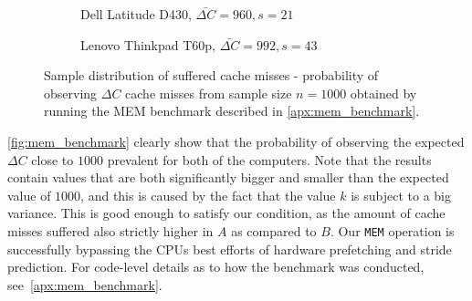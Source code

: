 \begin{figure}[ht]
    \begin{subfigure}{0.5\textwidth}
        \centering
        \caption{Dell Latitude D430, $\bar{\Delta C} = 960, s=21$ }
    \end{subfigure}
    \begin{subfigure}{0.5\textwidth}
        \centering
        \caption{Lenovo Thinkpad T60p, $\bar{\Delta C} = 992, s=43$ }
    \end{subfigure}
    \caption{Sample distribution of suffered cache misses - probability of observing \(\Delta C\) cache misses from sample size $n=1000$ obtained by running the MEM benchmark described in \autoref{apx:mem_benchmark}.}
    \label{fig:mem_benchmark}
\end{figure}

\autoref{fig:mem_benchmark} clearly show that the probability of observing the expected \(\Delta C\) close to \(1000\) prevalent for both of the computers.
Note that the results contain values that are both significantly bigger and smaller than the expected value of \(1000\), and this is caused by the fact that the value \(k\) is subject to a big variance.
This is good enough to satisfy our condition, as the amount of cache misses suffered also strictly higher in \(A\) as compared to \(B\).
Our \texttt{MEM} operation is successfully bypassing the \gls{CPU}s best efforts of hardware prefetching and stride prediction.
For code-level details as to how the benchmark was conducted, see~\autoref{apx:mem_benchmark}.


